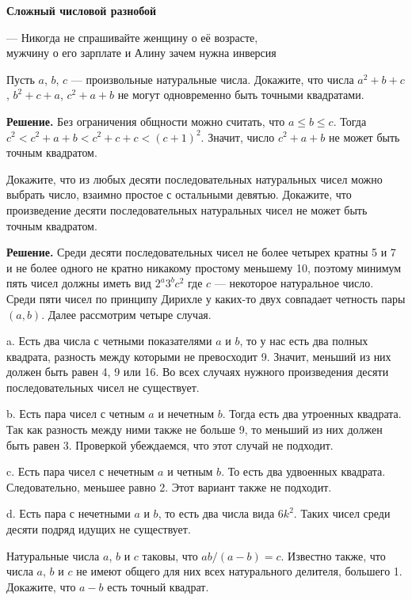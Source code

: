 \centerline{\bf \Huge Сложный числовой разнобой}

\begin{flushright}
        \scriptsize{--- Никогда не спрашивайте женщину о её возрасте,\\ мужчину о его зарплате и Алину зачем нужна инверсия}
\end{flushright}

Пусть $a$, $b$, $c$ — произвольные натуральные числа. Докажите, что числа $a^2+b+c$, $b^2+c+a$, $c^2+a+b$ не могут одновременно быть точными квадратами.

\textbf{Решение.}
Без ограничения общности можно считать, что $a\leq b\leq c$. Тогда $c^2<c^2+a+b<c^2+c+c < (c+1)^2$. Значит, число $c^2+a+b$ не может быть точным квадратом.

Докажите, что из любых десяти последовательных натуральных чисел можно выбрать число, взаимно простое с остальными девятью. Докажите, что произведение десяти последовательных натуральных чисел не может быть точным квадратом.

\textbf{Решение.}
Среди десяти последовательных чисел не более четырех кратны 5 и 7 и не более одного не кратно никакому простому меньшему 10, поэтому минимум пять чисел должны иметь вид $2^a3^bc^2$ где $c$ — некоторое натуральное число. Среди пяти чисел по принципу Дирихле у каких-то двух совпадает четность пары $(a,b)$. Далее рассмотрим четыре случая.

a. Есть два числа с четными показателями $a$ и $b$, то у нас есть два полных квадрата, разность между которыми не превосходит 9. Значит, меньший из них должен быть равен 4, 9 или 16. Во всех случаях нужного произведения десяти последовательных чисел не существует.

b. Есть пара чисел с четным $a$ и нечетным $b$. Тогда есть два утроенных квадрата. Так как разность между ними также не больше 9, то меньший из них должен быть равен 3. Проверкой убеждаемся, что этот случай не подходит.

c. Есть пара чисел с нечетным $a$ и четным $b$. То есть два удвоенных квадрата. Следовательно, меньшее равно 2. Этот вариант также не подходит.

d. Есть пара с нечетными $a$ и $b$, то есть два числа вида $6k^2$. Таких чисел среди десяти подряд идущих не существует.

Натуральные числа $a$, $b$ и $c$ таковы, что $ab/(a-b)=c$. Известно также, что числа $a$, $b$ и $c$ не имеют общего для них всех натурального делителя, большего 1. Докажите, что $a-b$ есть точный квадрат.


